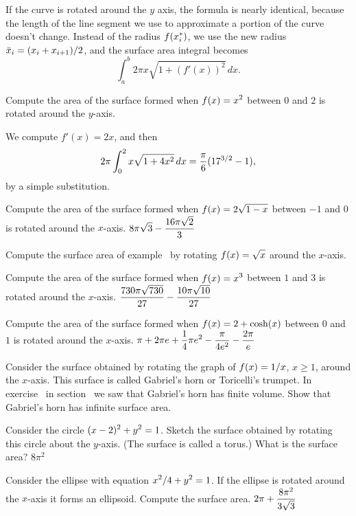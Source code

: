If the curve is rotated around the $y$ axis, the formula is nearly
identical, because the length of the line segment we use to
approximate a portion of the curve doesn't change. Instead of the
radius $\displaystyle f(x_i^*)$, we use the new radius $\displaystyle \bar x_i=
(x_i+x_{i+1})/2$, and the surface area integral becomes
$$\int_a^b 2\pi x\sqrt{1+(f'(x))^2}\,dx.$$

\example \relax
{}
Compute the area of the surface formed when $\displaystyle f(x)
=x^2$ between $0$ and $2$ is rotated around the $y$-axis.

We compute $f'(x)= 2x$, and then
$$2\pi\int_0^2 x\sqrt{1+4x^2}\,dx={\pi\over6}(17^{3/2}-1),$$
by a simple substitution.
\endexample

\exercises

\exercise Compute the area of the surface formed when $\displaystyle f(x)=2\sqrt{1-x}$
between $-1$ and $0$ is rotated around the $x$-axis.
\answer $\displaystyle 8\pi\sqrt3-{16\pi\sqrt2\over 3}$
\endanswer
\endexercise

\exercise Compute the surface area of example~ by rotating $\displaystyle f(x)=\sqrt x$ around the $x$-axis.
\endexercise

\exercise Compute the area of the surface formed when 
$\displaystyle f(x)=x^3$ between $1$ and $3$ is rotated around the $x$-axis.
\answer $\displaystyle {730\pi\sqrt{730}\over27}-{10\pi\sqrt{10}\over 27}$
\endanswer
\endexercise

\exercise Compute the area of the surface formed when 
$\displaystyle f(x)=2 +\cosh (x)$ between $0$ and $1$ is rotated around the
  $x$-axis.
\answer $\displaystyle \pi +2\pi e+ {1\over4}\pi e^2-{\pi\over4e^2}-{2\pi\over e}$
\endanswer
\endexercise

\exercise Consider the surface obtained by rotating the graph of $\displaystyle
f(x)=1/x$, $x\geq 1$, around the $x$-axis. This surface is called
{\dfont Gabriel's horn\/} or {\dfont Toricelli's
  trumpet}.  
In exercise~ in 
section~ we saw that Gabriel's horn has
finite volume. 
Show that Gabriel's horn has
infinite surface area.
\endexercise

\exercise Consider the circle $\displaystyle (x-2)^2+y^2 = 1$. Sketch the
surface obtained by rotating this circle about the $y$-axis. (The
surface is called a {\dfont torus}.) What is the surface area?
\answer $8\pi^2$
\endanswer
\endexercise

\exercise Consider the ellipse with equation $\displaystyle x^2/4+y^2 = 1$.
If the ellipse is rotated around the $x$-axis it forms 
an {\dfont ellipsoid}.
Compute the surface area.
\answer $\displaystyle 2\pi+{8\pi^2\over 3\sqrt{3}}$
\endanswer
\endexercise

